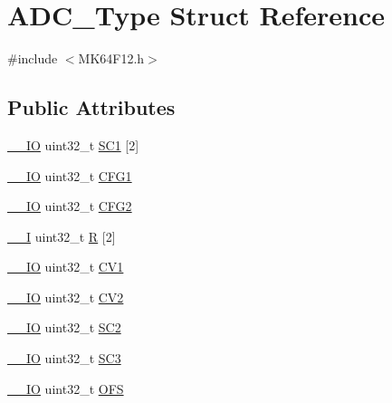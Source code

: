 \hypertarget{structADC__Type}{}\section{A\+D\+C\+\_\+\+Type Struct Reference}
\label{structADC__Type}


{\ttfamily \#include $<$M\+K64\+F12.\+h$>$}

\subsection*{Public Attributes}
\begin{DoxyCompactItemize}
\item 
\hyperlink{core__sc300_8h_aec43007d9998a0a0e01faede4133d6be}{\+\_\+\+\_\+\+IO} uint32\+\_\+t \hyperlink{structADC__Type_a093e1feaef0edc25a2a6740947bc760c}{S\+C1} \mbox{[}2\mbox{]}
\item 
\hyperlink{core__sc300_8h_aec43007d9998a0a0e01faede4133d6be}{\+\_\+\+\_\+\+IO} uint32\+\_\+t \hyperlink{structADC__Type_a440cce9a58e10f21220241a51442b71c}{C\+F\+G1}
\item 
\hyperlink{core__sc300_8h_aec43007d9998a0a0e01faede4133d6be}{\+\_\+\+\_\+\+IO} uint32\+\_\+t \hyperlink{structADC__Type_a089c1cc67b67d8cc7ac213a28d317bf8}{C\+F\+G2}
\item 
\hyperlink{core__sc300_8h_af63697ed9952cc71e1225efe205f6cd3}{\+\_\+\+\_\+I} uint32\+\_\+t \hyperlink{structADC__Type_af7aa0f906f46c2a00a0f1160f738e935}{R} \mbox{[}2\mbox{]}
\item 
\hyperlink{core__sc300_8h_aec43007d9998a0a0e01faede4133d6be}{\+\_\+\+\_\+\+IO} uint32\+\_\+t \hyperlink{structADC__Type_ac8a4d66d82362aab14f46b3a2947a7b7}{C\+V1}
\item 
\hyperlink{core__sc300_8h_aec43007d9998a0a0e01faede4133d6be}{\+\_\+\+\_\+\+IO} uint32\+\_\+t \hyperlink{structADC__Type_aca49bcd5d7bc64184e106decf4e7f750}{C\+V2}
\item 
\hyperlink{core__sc300_8h_aec43007d9998a0a0e01faede4133d6be}{\+\_\+\+\_\+\+IO} uint32\+\_\+t \hyperlink{structADC__Type_a7397e1ccace879809b64c8b689a13418}{S\+C2}
\item 
\hyperlink{core__sc300_8h_aec43007d9998a0a0e01faede4133d6be}{\+\_\+\+\_\+\+IO} uint32\+\_\+t \hyperlink{structADC__Type_af69704301d23c620abacbbdfa7caa05e}{S\+C3}
\item 
\hyperlink{core__sc300_8h_aec43007d9998a0a0e01faede4133d6be}{\+\_\+\+\_\+\+IO} uint32\+\_\+t \hyperlink{structADC__Type_a1081f8facbb93133c09e83ef18b90b10}{O\+FS}

\end{DoxyCompactItemize}
